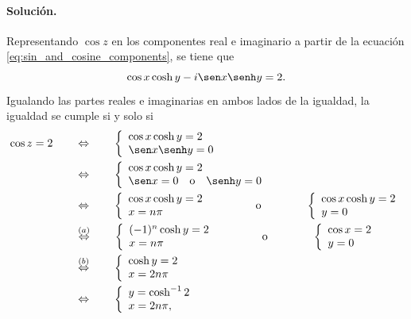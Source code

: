 \documentclass[a4paper]{report}
\begin{document}
\paragraph{Solución.} Representando \(\cos z\) en los componentes real e imaginario a partir de la ecuación \ref{eq:sin_and_cosine_components}, se tiene que 
\[
 \cos x\cosh y-i\sen x\senh y=2.
\]
Igualando las partes reales e imaginarias en ambos lados de la igualdad, la igualdad se cumple si y solo si
\begin{align*}
 \cos z=2
 \qquad&\Leftrightarrow\qquad
  \left\{ 
  \begin{array}{l}
   \cos x\cosh y=2\\
   \sen x\senh y=0
  \end{array}\right.\\
 \qquad&\Leftrightarrow\qquad
  \left\{ 
  \begin{array}{l}
   \cos x\cosh y=2\\
   \sen x=0\quad\textrm{o}\quad\senh y=0
  \end{array}\right.\\
  \qquad&\Leftrightarrow\qquad
  \left\{ 
  \begin{array}{l}
   \cos x\cosh y=2\\
   x=n\pi
  \end{array}\right.
  \qquad\qquad\textrm{o}\qquad\qquad
  \left\{ 
  \begin{array}{l}
   \cos x\cosh y=2\\
   y=0
  \end{array}\right.\\
  \qquad&\overset{(a)}{\Leftrightarrow}\qquad
  \left\{ 
  \begin{array}{l}
   (-1)^n\cosh y=2\\
   x=n\pi
  \end{array}\right.
  \qquad\qquad\textrm{o}\qquad\qquad
  \left\{ 
  \begin{array}{l}
   \cos x=2\\
   y=0
  \end{array}\right.\\
  \qquad&\overset{(b)}{\Leftrightarrow}\qquad
  \left\{ 
  \begin{array}{l}
   \cosh y=2\\
   x=2n\pi
  \end{array}\right.\\
  \qquad&\Leftrightarrow\qquad
  \left\{ 
  \begin{array}{l}
   y=\cosh^{-1}2\\
   x=2n\pi,
  \end{array}\right.
\end{align*}
\end{document}

